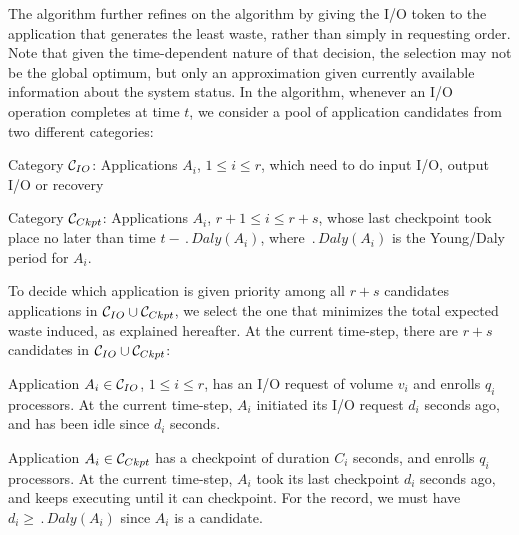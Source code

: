 The \leastwaste algorithm further refines on the \fifononblock algorithm
by giving the I/O token to the application that generates the least
waste, rather than simply in requesting order. Note that given the time-dependent nature of that decision, the selection may
not be the global optimum, but only an approximation given currently
available information about the system status.
In the \leastwaste algorithm, whenever an I/O operation completes at time $t$,
we consider a pool of application candidates from two different categories:
\begin{compactitem}
 \item Category \IOcat $\mathcal{C}_{IO}$: Applications $A_{i}$, $1\leq i \leq r$, which
 need to do input I/O, output I/O or recovery
 \item Category \Ckptcat $\mathcal{C}_{Ckpt}$: Applications $A_{i}$, $r+1\leq i \leq r+s$,
 whose last checkpoint took place no later than time $t - \period{Daly}(A_{i})$, where
 $\period{Daly}(A_{i})$ is the Young/Daly period for $A_{i}$.
\end{compactitem}

To decide which application is given priority among all $r+s$ candidates
applications in $\mathcal{C}_{IO} \cup \mathcal{C}_{Ckpt}$, we select the one that
minimizes the total expected waste induced, as explained hereafter.
At the current time-step, there are $r+s$ candidates in $\mathcal{C}_{IO} \cup \mathcal{C}_{Ckpt}$:
\begin{compactitem}
%
  \item Application $A_{i} \in \mathcal{C}_{IO}$, $1\leq i \leq r$, has an I/O request
  of volume $v_{i}$ and enrolls $q_{i}$ processors. At the current time-step,
  $A_{i}$ initiated its I/O request $d_{i}$ seconds ago, and has been idle since
  $d_{i}$ seconds.
%
 \item Application $A_{i} \in  \mathcal{C}_{Ckpt}$ has a checkpoint of duration $C_{i}$
 seconds, and enrolls $q_{i}$ processors. At the current time-step, $A_{i}$ took
 its last checkpoint $d_{i}$ seconds ago, and keeps executing until it can
 checkpoint. For the record, we must have $d_{i} \geq \period{Daly}(A_{i})$
 since $A_{i}$ is a candidate.
%
\end{compactitem}

